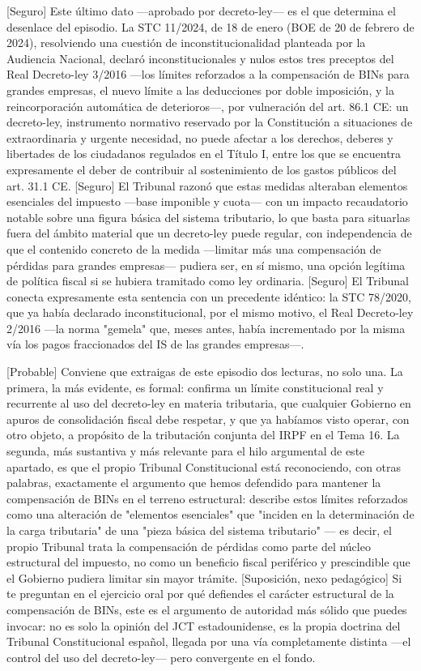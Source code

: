 \documentclass[10pt,a4paper]{article}
\begin{document}
[Seguro] Este último dato —aprobado por decreto-ley— es el que determina el desenlace del episodio. La STC 11/2024, de 18 de enero (BOE de 20 de febrero de 2024), resolviendo una cuestión de inconstitucionalidad planteada por la Audiencia Nacional, declaró inconstitucionales y nulos estos tres preceptos del Real Decreto-ley 3/2016 —los límites reforzados a la compensación de BINs para grandes empresas, el nuevo límite a las deducciones por doble imposición, y la reincorporación automática de deterioros—, por vulneración del art. 86.1 CE: un decreto-ley, instrumento normativo reservado por la Constitución a situaciones de extraordinaria y urgente necesidad, no puede afectar a los derechos, deberes y libertades de los ciudadanos regulados en el Título I, entre los que se encuentra expresamente el deber de contribuir al sostenimiento de los gastos públicos del art. 31.1 CE. [Seguro] El Tribunal razonó que estas medidas alteraban elementos esenciales del impuesto —base imponible y cuota— con un impacto recaudatorio notable sobre una figura básica del sistema tributario, lo que basta para situarlas fuera del ámbito material que un decreto-ley puede regular, con independencia de que el contenido concreto de la medida —limitar más una compensación de pérdidas para grandes empresas— pudiera ser, en sí mismo, una opción legítima de política fiscal si se hubiera tramitado como ley ordinaria. [Seguro] El Tribunal conecta expresamente esta sentencia con un precedente idéntico: la STC 78/2020, que ya había declarado inconstitucional, por el mismo motivo, el Real Decreto-ley 2/2016 —la norma "gemela" que, meses antes, había incrementado por la misma vía los pagos fraccionados del IS de las grandes empresas—.

[Probable] Conviene que extraigas de este episodio dos lecturas, no solo una. La primera, la más evidente, es formal: confirma un límite constitucional real y recurrente al uso del decreto-ley en materia tributaria, que cualquier Gobierno en apuros de consolidación fiscal debe respetar, y que ya habíamos visto operar, con otro objeto, a propósito de la tributación conjunta del IRPF en el Tema 16. La segunda, más sustantiva y más relevante para el hilo argumental de este apartado, es que el propio Tribunal Constitucional está reconociendo, con otras palabras, exactamente el argumento que hemos defendido para mantener la compensación de BINs en el terreno estructural: describe estos límites reforzados como una alteración de "elementos esenciales" que "inciden en la determinación de la carga tributaria" de una "pieza básica del sistema tributario" — es decir, el propio Tribunal trata la compensación de pérdidas como parte del núcleo estructural del impuesto, no como un beneficio fiscal periférico y prescindible que el Gobierno pudiera limitar sin mayor trámite. [Suposición, nexo pedagógico] Si te preguntan en el ejercicio oral por qué defiendes el carácter estructural de la compensación de BINs, este es el argumento de autoridad más sólido que puedes invocar: no es solo la opinión del JCT estadounidense, es la propia doctrina del Tribunal Constitucional español, llegada por una vía completamente distinta —el control del uso del decreto-ley— pero convergente en el fondo.
\end{document}
